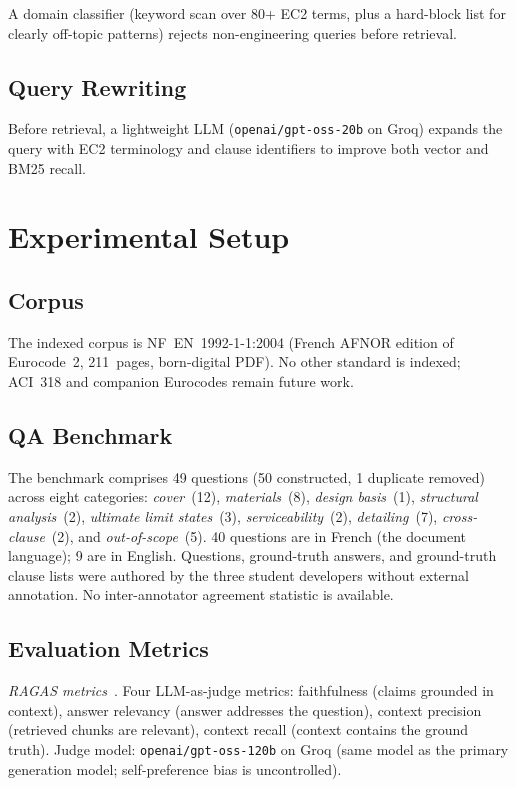 \documentclass[conference]{IEEEtran}
\begin{document}
A domain classifier (keyword scan over 80+ EC2 terms, plus a hard-block
list for clearly off-topic patterns) rejects non-engineering queries
before retrieval.

\subsection{Query Rewriting}

Before retrieval, a lightweight LLM (\texttt{openai/gpt-oss-20b} on
Groq) expands the query with EC2 terminology and clause identifiers to
improve both vector and BM25 recall.

\section{Experimental Setup}
\label{sec:setup}

\subsection{Corpus}

The indexed corpus is NF~EN~1992-1-1:2004 (French AFNOR edition of
Eurocode~2, 211~pages, born-digital PDF).
No other standard is indexed; ACI~318 and companion Eurocodes remain
future work.

\subsection{QA Benchmark}

The benchmark comprises 49 questions (50 constructed, 1 duplicate
removed) across eight categories: \textit{cover}~(12),
\textit{materials}~(8), \textit{design basis}~(1),
\textit{structural analysis}~(2), \textit{ultimate limit states}~(3),
\textit{serviceability}~(2), \textit{detailing}~(7),
\textit{cross-clause}~(2), and \textit{out-of-scope}~(5).
40 questions are in French (the document language); 9 are in English.
Questions, ground-truth answers, and ground-truth clause lists were
authored by the three student developers without external annotation.
No inter-annotator agreement statistic is available.

\subsection{Evaluation Metrics}

\textit{RAGAS metrics}~\cite{es2023ragas}.
Four LLM-as-judge metrics: faithfulness (claims grounded in context),
answer relevancy (answer addresses the question), context precision
(retrieved chunks are relevant), context recall (context contains the
ground truth).
Judge model: \texttt{openai/gpt-oss-120b} on Groq (same model as the
primary generation model; self-preference bias is uncontrolled).
\end{document}
